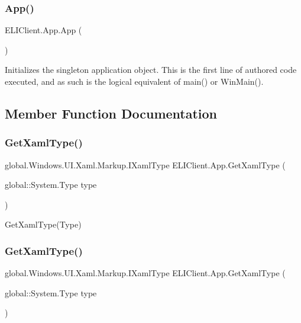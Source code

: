 \subsubsection{\texorpdfstring{App()}{App()}}
{\footnotesize\ttfamily E\+L\+I\+Client.\+App.\+App (\begin{DoxyParamCaption}{ }\end{DoxyParamCaption})\hspace{0.3cm}{\ttfamily [inline]}}



Initializes the singleton application object. This is the first line of authored code executed, and as such is the logical equivalent of main() or Win\+Main(). 



\subsection{Member Function Documentation}
\mbox{\label{class_e_l_i_client_1_1_app_ae477bc9118b99c788c60b60fdd6e7bb8}} 
\subsubsection{\texorpdfstring{Get\+Xaml\+Type()}{GetXamlType()}\hspace{0.1cm}{\footnotesize\ttfamily [1/6]}}
{\footnotesize\ttfamily global.\+Windows.\+U\+I.\+Xaml.\+Markup.\+I\+Xaml\+Type E\+L\+I\+Client.\+App.\+Get\+Xaml\+Type (\begin{DoxyParamCaption}\item[{global\+::\+System.\+Type}]{type }\end{DoxyParamCaption})\hspace{0.3cm}{\ttfamily [inline]}}



Get\+Xaml\+Type(\+Type) 

\mbox{\label{class_e_l_i_client_1_1_app_ae477bc9118b99c788c60b60fdd6e7bb8}} 
\subsubsection{\texorpdfstring{Get\+Xaml\+Type()}{GetXamlType()}\hspace{0.1cm}{\footnotesize\ttfamily [2/6]}}
{\footnotesize\ttfamily global.\+Windows.\+U\+I.\+Xaml.\+Markup.\+I\+Xaml\+Type E\+L\+I\+Client.\+App.\+Get\+Xaml\+Type (\begin{DoxyParamCaption}\item[{global\+::\+System.\+Type}]{type }\end{DoxyParamCaption})\hspace{0.3cm}{\ttfamily [inline]}}



